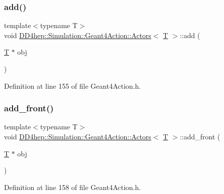 \subsubsection{\texorpdfstring{add()}{add()}}
{\footnotesize\ttfamily template$<$typename T$>$ \\
void \hyperlink{class_d_d4hep_1_1_simulation_1_1_geant4_action_1_1_actors}{D\+D4hep\+::\+Simulation\+::\+Geant4\+Action\+::\+Actors}$<$ \hyperlink{class_t}{T} $>$\+::add (\begin{DoxyParamCaption}\item[{\hyperlink{class_t}{T} $\ast$}]{obj }\end{DoxyParamCaption})\hspace{0.3cm}{\ttfamily [inline]}}



Definition at line 155 of file Geant4\+Action.\+h.

\hypertarget{class_d_d4hep_1_1_simulation_1_1_geant4_action_1_1_actors_a024c3bcc6d543af13bf58066d245df9a}{}\label{class_d_d4hep_1_1_simulation_1_1_geant4_action_1_1_actors_a024c3bcc6d543af13bf58066d245df9a} 
\subsubsection{\texorpdfstring{add\+\_\+front()}{add\_front()}}
{\footnotesize\ttfamily template$<$typename T$>$ \\
void \hyperlink{class_d_d4hep_1_1_simulation_1_1_geant4_action_1_1_actors}{D\+D4hep\+::\+Simulation\+::\+Geant4\+Action\+::\+Actors}$<$ \hyperlink{class_t}{T} $>$\+::add\+\_\+front (\begin{DoxyParamCaption}\item[{\hyperlink{class_t}{T} $\ast$}]{obj }\end{DoxyParamCaption})\hspace{0.3cm}{\ttfamily [inline]}}



Definition at line 158 of file Geant4\+Action.\+h.

\hypertarget{class_d_d4hep_1_1_simulation_1_1_geant4_action_1_1_actors_a400f8d564251e0bba5cdb1e35f58b72a}{}\label{class_d_d4hep_1_1_simulation_1_1_geant4_action_1_1_actors_a400f8d564251e0bba5cdb1e35f58b72a} 
